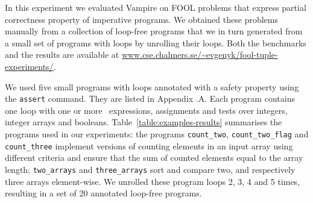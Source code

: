

In this experiment we evaluated Vampire on FOOL problems that express partial correctness property of imperative programs. We obtained these problems manually from a collection of loop-free programs that we in turn generated from a small set of programs with loops by unrolling their loops. Both the benchmarks and the results are available at \url{www.cse.chalmers.se/~evgenyk/fool-tuple-experiments/}.


%
We used five small programs with loops annotated with a safety property using the {\tt assert} command. They are listed in Appendix \thechapter.A. Each program contains one loop with one or more
\ITE\ expressions, assignments and tests over integers,
integer arrays and booleans. Table~\ref{table:examples-results}
summarises the programs used in our experiments: the programs
\verb'count_two',  \verb'count_two_flag' and \verb'count_three'
implement versions of counting elements in an input array using
different criteria and ensure that the sum of counted elements equal
to the array length; \verb'two_arrays' and \verb'three_arrays' sort
and compare 
two, and respectively three arrays element-wise. 
We unrolled these program loops 2, 3, 4 and 5
times, resulting in a set of 20 annotated loop-free programs.
